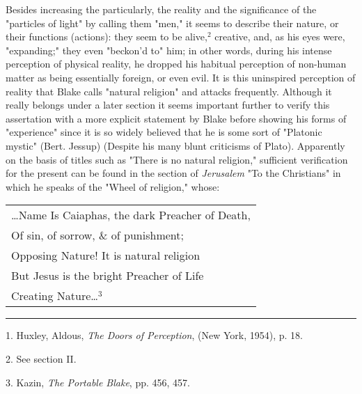 \hspace*{5mm}Besides increasing the particularly, the reality and the significance of the "particles of light"
by calling them "men," it seems to describe their nature, or their functions (actions):
they seem to be alive,$^{2}$ creative, and, as his eyes were, "expanding;" they even
"beckon'd to" him; in other words, during his intense perception of physical reality, he dropped
his habitual perception of non-human matter as being essentially foreign, or even evil. It is this uninspired
perception of reality that Blake calls "natural religion" and attacks frequently.
Although it really belongs under a later section it seems important further to verify this
assertation with a more explicit statement by Blake before showing his forms of "experience" since it
is so widely believed that he is some sort of "Platonic mystic" (Bert. Jessup) (Despite his many blunt
criticisms of Plato). Apparently on the basis of titles such as "There is no 
natural religion," sufficient verification for the present can be found in the section of \textit{Jerusalem}
"To the Christians" in which he speaks of the "Wheel of religion," whose:\linebreak
\null\par
\vspace*{-\baselineskip}
\begin{center}
	\parbox{0.8\textwidth}{
		\centering
		\begin{tabular}{l}
			\dots Name Is Caiaphas, the dark Preacher of Death, \\
			Of sin, of sorrow, \& of punishment;                \\
			Opposing Nature! It is natural religion             \\
			But Jesus is the bright Preacher of Life            \\
			Creating Nature\dots$^{3}$
		\end{tabular}
	}%
\end{center}
\vspace*{\fill}
\noindent\rule{0.25\textwidth}{0.4pt}\par
1. Huxley, Aldous, \textit{The Doors of Perception}, (New York, 1954), p. 18.\par
2. See section II.\par
3. Kazin, \textit{The Portable Blake}, pp. 456, 457.\par

\newpage

